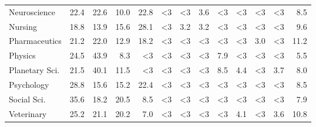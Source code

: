 \begin{tabular}{lrrrrrrrrrrrr}
Neuroscience      &         22.4 &              22.6 &           10.0 &            22.8 &                 <3 &                <3 &                  3.6 &                     <3 &                  <3 &             <3 &          <3 &    8.5 \\
Nursing           &         18.8 &              13.9 &           15.6 &            28.1 &                 <3 &               3.2 &                  3.2 &                     <3 &                  <3 &             <3 &          <3 &    9.6 \\
Pharmaceutics     &         21.2 &              22.0 &           12.9 &            18.2 &                 <3 &                <3 &                   <3 &                     <3 &                  <3 &            3.0 &          <3 &   11.2 \\
Physics           &         24.5 &              43.9 &            8.3 &              <3 &                 <3 &                <3 &                   <3 &                    7.9 &                  <3 &             <3 &          <3 &    5.5 \\
Planetary Sci.    &         21.5 &              40.1 &           11.5 &              <3 &                 <3 &                <3 &                   <3 &                    8.5 &                 4.4 &             <3 &         3.7 &    8.0 \\
Psychology        &         28.8 &              15.6 &           15.2 &            22.4 &                 <3 &                <3 &                   <3 &                     <3 &                  <3 &             <3 &          <3 &    8.5 \\
Social Sci.       &         35.6 &              18.2 &           20.5 &             8.5 &                 <3 &                <3 &                   <3 &                     <3 &                  <3 &             <3 &          <3 &    7.9 \\
Veterinary        &         25.2 &              21.1 &           20.2 &             7.0 &                 <3 &                <3 &                   <3 &                     <3 &                 4.1 &             <3 &         3.6 &   10.8 \\
\bottomrule
\end{tabular}
